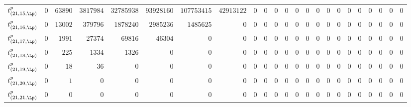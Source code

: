 \begin{tabular}{r|rrrrrrrrrrrrrrrrrrrrrr}
  $t^{p}_{(21,15,\Lp)}$ & $0$ & $63890$ & $3817984$ & $32785938$ & $93928160$ & $107753415$ & $42913122$ & $0$ & $0$ & $0$ & $0$ & $0$ & $0$ & $0$ & $0$ & $0$ & $0$ & $0$ & $0$ & $0$ & $0$ & $0$ \\
  $t^{p}_{(21,16,\Lp)}$ & $0$ & $13002$ & $379796$ & $1878240$ & $2985236$ & $1485625$ & $0$ & $0$ & $0$ & $0$ & $0$ & $0$ & $0$ & $0$ & $0$ & $0$ & $0$ & $0$ & $0$ & $0$ & $0$ & $0$ \\
  $t^{p}_{(21,17,\Lp)}$ & $0$ & $1991$ & $27374$ & $69816$ & $46304$ & $0$ & $0$ & $0$ & $0$ & $0$ & $0$ & $0$ & $0$ & $0$ & $0$ & $0$ & $0$ & $0$ & $0$ & $0$ & $0$ & $0$ \\
  $t^{p}_{(21,18,\Lp)}$ & $0$ & $225$ & $1334$ & $1326$ & $0$ & $0$ & $0$ & $0$ & $0$ & $0$ & $0$ & $0$ & $0$ & $0$ & $0$ & $0$ & $0$ & $0$ & $0$ & $0$ & $0$ & $0$ \\
  $t^{p}_{(21,19,\Lp)}$ & $0$ & $18$ & $36$ & $0$ & $0$ & $0$ & $0$ & $0$ & $0$ & $0$ & $0$ & $0$ & $0$ & $0$ & $0$ & $0$ & $0$ & $0$ & $0$ & $0$ & $0$ & $0$ \\
  $t^{p}_{(21,20,\Lp)}$ & $0$ & $1$ & $0$ & $0$ & $0$ & $0$ & $0$ & $0$ & $0$ & $0$ & $0$ & $0$ & $0$ & $0$ & $0$ & $0$ & $0$ & $0$ & $0$ & $0$ & $0$ & $0$ \\
  $t^{p}_{(21,21,\Lp)}$ & $0$ & $0$ & $0$ & $0$ & $0$ & $0$ & $0$ & $0$ & $0$ & $0$ & $0$ & $0$ & $0$ & $0$ & $0$ & $0$ & $0$ & $0$ & $0$ & $0$ & $0$ & $0$ \\
\end{tabular}
